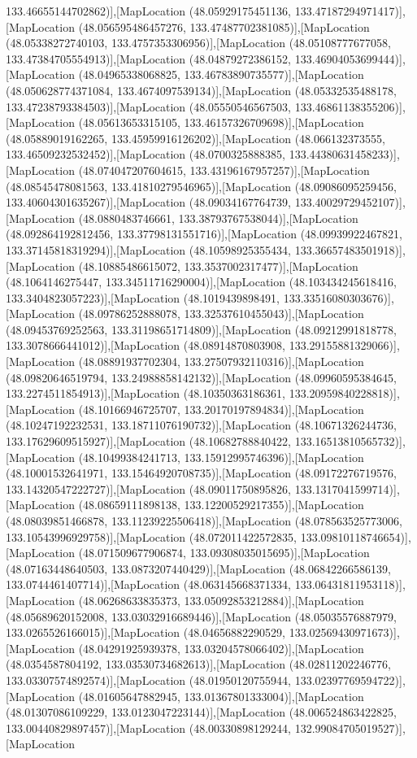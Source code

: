 133.46655144702862)],[MapLocation (48.05929175451136, 133.47187294971417)],[MapLocation (48.056595486457276, 133.47487702381085)],[MapLocation (48.05338272740103, 133.4757353306956)],[MapLocation (48.05108777677058, 133.47384705554913)],[MapLocation (48.04879272386152, 133.46904053699444)],[MapLocation (48.04965338068825, 133.46783890735577)],[MapLocation (48.050628774371084, 133.4674097539134)],[MapLocation (48.05332535488178, 133.47238793384503)],[MapLocation (48.05550546567503, 133.46861138355206)],[MapLocation (48.05613653315105, 133.46157326709698)],[MapLocation (48.05889019162265, 133.45959916126202)],[MapLocation (48.066132373555, 133.46509232532452)],[MapLocation (48.0700325888385, 133.44380631458233)],[MapLocation (48.074047207604615, 133.43196167957257)],[MapLocation (48.08545478081563, 133.41810279546965)],[MapLocation (48.09086095259456, 133.40604301635267)],[MapLocation (48.09034167764739, 133.40029729452107)],[MapLocation (48.0880483746661, 133.38793767538044)],[MapLocation (48.092864192812456, 133.37798131551716)],[MapLocation (48.09939922467821, 133.37145818319294)],[MapLocation (48.10598925355434, 133.36657483501918)],[MapLocation (48.10885486615072, 133.3537002317477)],[MapLocation (48.1064146275447, 133.34511716290004)],[MapLocation (48.103434245618416, 133.3404823057223)],[MapLocation (48.1019439898491, 133.33516080303676)],[MapLocation (48.09786252888078, 133.32537610455043)],[MapLocation (48.09453769252563, 133.31198651714809)],[MapLocation (48.09212991818778, 133.3078666441012)],[MapLocation (48.08914870803908, 133.29155881329066)],[MapLocation (48.08891937702304, 133.27507932110316)],[MapLocation (48.09820646519794, 133.24988858142132)],[MapLocation (48.09960595384645, 133.2274511854913)],[MapLocation (48.10350363186361, 133.20959840228818)],[MapLocation (48.10166946725707, 133.20170197894834)],[MapLocation (48.10247192232531, 133.18711076190732)],[MapLocation (48.10671326244736, 133.17629609515927)],[MapLocation (48.10682788840422, 133.16513810565732)],[MapLocation (48.10499384241713, 133.15912995746396)],[MapLocation (48.10001532641971, 133.15464920708735)],[MapLocation (48.09172276719576, 133.14320547222727)],[MapLocation (48.09011750895826, 133.1317041599714)],[MapLocation (48.08659111898138, 133.12200529217355)],[MapLocation (48.08039851466878, 133.11239225506418)],[MapLocation (48.078563525773006, 133.10543996929758)],[MapLocation (48.072011422572835, 133.09810118746654)],[MapLocation (48.071509677906874, 133.09308035015695)],[MapLocation (48.07163448640503, 133.0873207440429)],[MapLocation (48.06842266586139, 133.0744461407714)],[MapLocation (48.063145668371334, 133.06431811953118)],[MapLocation (48.06268633835373, 133.05092853212884)],[MapLocation (48.05689620152008, 133.03032916689446)],[MapLocation (48.05035576887979, 133.0265526166015)],[MapLocation (48.04656882290529, 133.02569430971673)],[MapLocation (48.04291925939378, 133.03204578066402)],[MapLocation (48.0354587804192, 133.03530734682613)],[MapLocation (48.02811202246776, 133.03307574892574)],[MapLocation (48.01950120755944, 133.02397769594722)],[MapLocation (48.01605647882945, 133.01367801333004)],[MapLocation (48.01307086109229, 133.0123047223144)],[MapLocation (48.006524863422825, 133.00440829897457)],[MapLocation (48.00330898129244, 132.99084705019527)],[MapLocation 